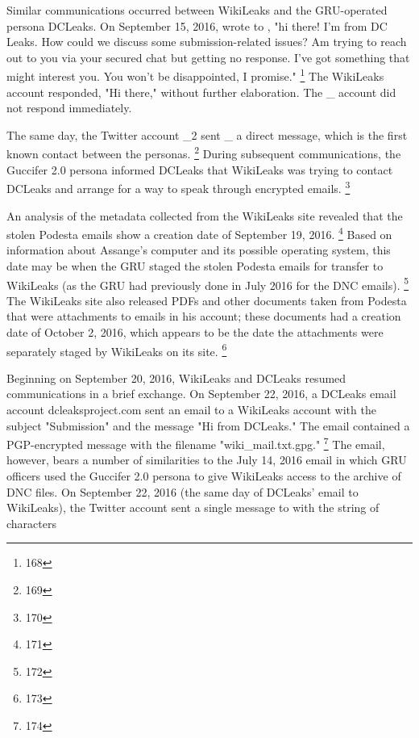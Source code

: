 Similar communications occurred between WikiLeaks and the GRU-operated persona DCLeaks.
On September 15, 2016, \@dcleaks wrote to \@WikiLeaks, "hi there!
I'm from DC Leaks.
How could we discuss some submission-related issues?
Am trying to reach out to you via your secured chat but getting no response.
I've got something that might interest you.
You won't be disappointed, I promise."%
\footnote{168}
The WikiLeaks account responded, "Hi there," without further elaboration.
The \@dcleaks\_ account did not respond immediately.

The same day, the Twitter account \@guccifer\_2 sent \@dcleaks\_ a direct message, which is the first known contact between the personas.%
\footnote{169}
During subsequent communications, the Guccifer 2.0 persona informed DCLeaks that WikiLeaks was trying to contact DCLeaks and arrange for a way to speak through encrypted emails.%
\footnote{170}

An analysis of the metadata collected from the WikiLeaks site revealed that the stolen Podesta emails show a  creation date of September 19, 2016.%
\footnote{171}
Based on information about Assange's computer and its possible operating system, this date may be when the GRU staged the stolen Podesta emails for transfer to WikiLeaks (as the GRU had previously done in July 2016 for the DNC emails).%
\footnote{172}
The WikiLeaks site also released PDFs and other documents taken from Podesta that were attachments to emails in his account; these documents had a creation date of October 2, 2016, which appears to be the date the attachments were separately staged by WikiLeaks on its site.%
\footnote{173}

Beginning on September 20, 2016, WikiLeaks and DCLeaks resumed communications in a brief exchange.
On September 22, 2016, a DCLeaks email account dcleaksproject\@gmail.com sent an email to a WikiLeaks account with the subject "Submission" and the message "Hi from DCLeaks."
The email contained a PGP-encrypted message with the filename "wiki\_mail.txt.gpg."%
\footnote{174}
The email, however, bears a number of similarities to the July 14, 2016 email in which GRU officers used the Guccifer 2.0 persona to give WikiLeaks access to the archive of DNC files.
On September 22, 2016 (the same day of DCLeaks' email to WikiLeaks), the Twitter account \@dcleaks sent a single message to \@WikiLeaks with the string of characters 

